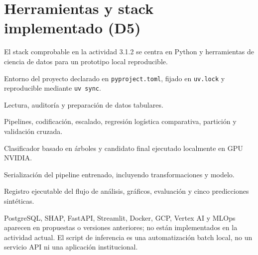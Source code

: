 \section{Herramientas y stack implementado (D5)}

El stack comprobable en la actividad 3.1.2 se centra en Python y herramientas de ciencia de datos para un prototipo local reproducible.

\begin{description}[style=nextline]
  \item[Python y uv] Entorno del proyecto declarado en \texttt{pyproject.toml}, fijado en \texttt{uv.lock} y reproducible mediante \texttt{uv sync}.
  \item[Pandas y NumPy] Lectura, auditoría y preparación de datos tabulares.
  \item[Scikit-learn] Pipelines, codificación, escalado, regresión logística comparativa, partición y validación cruzada.
  \item[XGBoost con CUDA] Clasificador basado en árboles y candidato final ejecutado localmente en GPU NVIDIA.
  \item[Joblib] Serialización del pipeline entrenado, incluyendo transformaciones y modelo.
  \item[Jupyter] Registro ejecutable del flujo de análisis, gráficos, evaluación y cinco predicciones sintéticas.
\end{description}

PostgreSQL, SHAP, FastAPI, Streamlit, Docker, GCP, Vertex AI y MLOps aparecen en propuestas o versiones anteriores; no están implementados en la actividad actual. El script de inferencia es una automatización batch local, no un servicio API ni una aplicación institucional.
